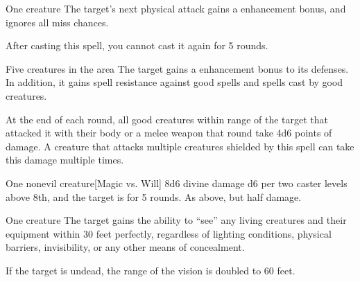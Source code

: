 \spellrng{\rngmed}
\begin{spelltarget}{One creature}
    \spelleffect The target's next physical attack gains a  enhancement bonus, and ignores all miss chances. 
\end{spelltarget}
\spellnotes After casting this spell, you cannot cast it again for 5 rounds.

\begin{comment}
\subsubsection{U-Z}
\end{comment}

\spelldur{\durshort \dismissable}
\begin{spelltargets}{Five creatures in the area}
    The target gains a  enhancement bonus to its defenses. In addition, it gains spell resistance against good spells and spells cast by good creatures.
    \par At the end of each round, all good creatures within \rngclose range of the target that attacked it with their body or a melee weapon that round take 4d6 points of damage. A creature that attacks multiple creatures shielded by this spell can take this damage multiple times.
\end{spelltargets}
\spellline

\spellrng{\rngmed}
\begin{spelltarget}{One nonevil creature}[Magic vs. Will]
    \spellsuccess 8d6 divine damage \add d6 per two caster levels above 8th, and the target is \sickened for 5 rounds.
    \spellfailure As above, but half damage.
\end{spelltarget}

\spelldur{\durlong \dismissable}
\begin{spelltarget}{One creature}
    \spelleffect The target gains the ability to ``see'' any living creatures and their equipment within 30 feet perfectly, regardless of lighting conditions, physical barriers, invisibility, or any other means of concealment.

    If the target is undead, the range of the vision is doubled to 60 feet.
\end{spelltarget}

